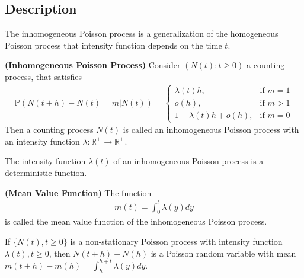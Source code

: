 \subsection{Description}
The inhomogeneous Poisson process is a generalization of the homogeneous Poisson process that intensity function depends on the time $t$.
\begin{definition}
	\textbf{(Inhomogeneous Poisson Process)} Consider $(N(t):t \geq 0)$ a counting process, that satisfies
	\begin{align*}
	\mathbb{P}(N(t+h)-N(t)=m|N(t))=
	\begin{cases}
	\lambda(t)h,& \text{if } m=1\\
	o(h) ,& \text{if } m>1\\
	1-\lambda(t)h+o(h),& \text{if } m=0
	\end{cases}
	\end{align*}
	Then a counting process $N(t)$ is called an inhomogeneous Poisson process with an intensity function $\lambda:\mathbb{R}^+ \rightarrow \mathbb{R}^+$.
\end{definition}
The intensity function $\lambda(t)$ of an inhomogeneous Poisson process is a deterministic function.
\begin{definition} \cite{thesis} \textbf{(Mean Value Function)} The function 
	\begin{align*}
	m(t) = \int_{0}^{t} \lambda(y)dy
	\end{align*}
	is called the mean value function of the inhomogeneous Poisson process.
\end{definition}
\begin{theorem}
	\cite{thesis} If $\{ N(t), t \geq 0\}$ is a non-stationary Poisson process with intensity function $\lambda(t), t \geq 0$, then $N(t + h) - N(h
	)$ is a Poisson random variable with mean $m(t + h) - m(h) = \displaystyle\int_{h}^{h + t}\lambda(y)dy$.
\end{theorem}
